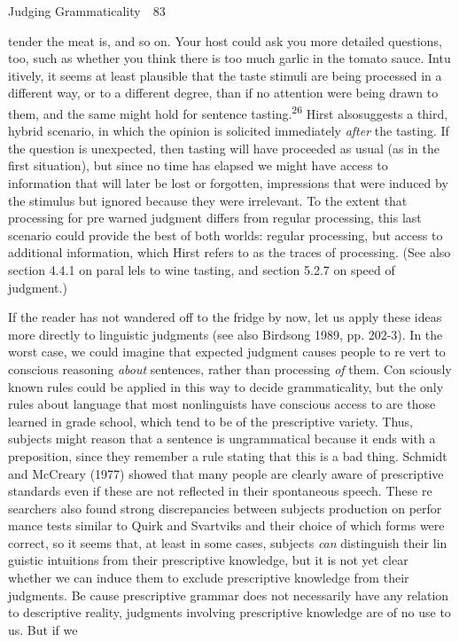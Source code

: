 \clearpage\setcounter{page}{1}\begin{styleStandard}
Judging Grammaticality\ \ 83
\end{styleStandard}


\begin{styleTextbody}
tender the meat is, and so on. Your host could ask you more detailed questions, too, such as whether you think there is too much garlic in the tomato sauce. Intu\- itively, it seems at least plausible that the taste stimuli are being processed in a different way, or to a different degree, than if no attention were being drawn to them, and the same might hold for sentence tasting.\textsuperscript{26}\textsuperscript{ }Hirst alsosuggests a third, hybrid scenario, in which the opinion is solicited immediately \textit{after}\textit{ }the tasting. If the question is unexpected, then tasting will have proceeded as usual (as in the first situation), but since no time has elapsed we might have access to information that will later be lost or forgotten, impressions that were induced by the stimulus but ignored because they were irrelevant. To the extent that processing for pre\- warned judgment differs from regular processing, this last scenario could provide the best of both worlds: regular processing, but access to additional information, which Hirst refers to as the traces of processing. (See also section 4.4.1 on paral\- lels to wine tasting, and section 5.2.7 on speed of judgment.)
\end{styleTextbody}


\begin{styleTextbody}
If the reader has not wandered off to the fridge by now, let us apply these ideas more directly to linguistic judgments (see also Birdsong 1989, pp. 202-3). In the worst case, we could imagine that expected judgment causes people to re\- vert to conscious reasoning \textit{about}\textit{ }sentences, rather than processing \textit{of}\textit{ }them. Con\- sciously known rules could be applied in this way to decide grammaticality, but the only rules about language that most nonlinguists have conscious access to are those learned in grade school, which tend to be of the prescriptive variety. Thus, subjects might reason that a sentence is ungrammatical because it ends with a preposition, since they remember a rule stating that this is a bad thing. Schmidt and McCreary {\textquotesingle}(1977) showed that many people are clearly aware of prescriptive standards even if these are not reflected in their spontaneous speech. These re\- searchers also found strong discrepancies between subjects{\textquotesingle} production on perfor\- mance tests similar to Quirk and Svartvik{\textquotesingle}s and their choice of which forms were correct, so it seems that, at least in some cases, subjects \textit{can }distinguish their lin\- guistic intuitions from their prescriptive knowledge, but it is not yet clear whether we can induce them to exclude prescriptive knowledge from their judgments. Be\- cause prescriptive grammar does not necessarily have any relation to descriptive reality, judgments involving prescriptive knowledge are of no use to us. But if we
\end{styleTextbody}


